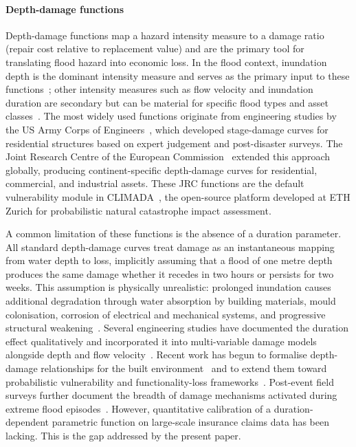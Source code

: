 \paragraph{Depth-damage functions}
Depth-damage functions map a hazard intensity measure to a damage ratio (repair cost relative to replacement value) and are the primary tool for translating flood hazard into economic loss. In the flood context, inundation depth is the dominant intensity measure and serves as the primary input to these functions~\cite{merz2010review, huizinga2017global}; other intensity measures such as flow velocity and inundation duration are secondary but can be material for specific flood types and asset classes~\cite{merz2010review}. The most widely used functions originate from engineering studies by the US Army Corps of Engineers~\cite{usace2003}, which developed stage-damage curves for residential structures based on expert judgement and post-disaster surveys. The Joint Research Centre of the European Commission~\cite{huizinga2017global} extended this approach globally, producing continent-specific depth-damage curves for residential, commercial, and industrial assets. These JRC functions are the default vulnerability module in CLIMADA~\cite{aznar2019climada}, the open-source platform developed at ETH Zurich for probabilistic natural catastrophe impact assessment.

A common limitation of these functions is the absence of a duration parameter. All standard depth-damage curves treat damage as an instantaneous mapping from water depth to loss, implicitly assuming that a flood of one metre depth produces the same damage whether it recedes in two hours or persists for two weeks. This assumption is physically unrealistic: prolonged inundation causes additional degradation through water absorption by building materials, mould colonisation, corrosion of electrical and mechanical systems, and progressive structural weakening~\cite{merz2010review}. Several engineering studies have documented the duration effect qualitatively and incorporated it into multi-variable damage models alongside depth and flow velocity~\cite{merz2010review}. Recent work has begun to formalise depth-damage relationships for the built environment~\cite{pistrika2014flood} and to extend them toward probabilistic vulnerability and functionality-loss frameworks~\cite{pandey2026urban, forte2025flash, gautam2022unzipping}. Post-event field surveys further document the breadth of damage mechanisms activated during extreme flood episodes~\cite{santangelo2021landslides, thapa2020catchment, santo2016post, chinh2016mekong}. However, quantitative calibration of a duration-dependent parametric function on large-scale insurance claims data has been lacking. This is the gap addressed by the present paper.


